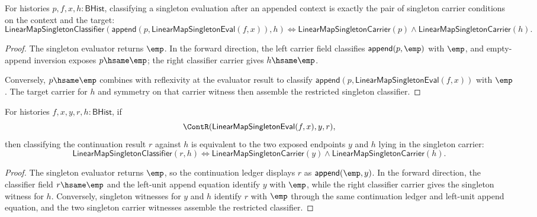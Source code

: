 \begin{theorem}
\label{thm:linearmap-singleton-eval-append-context-classifier}
For histories $p,f,x,h:\mathsf{BHist}$, classifying a singleton evaluation
after an appended context is exactly the pair of singleton carrier conditions
on the context and the target:
$$
\mathsf{LinearMapSingletonClassifier}
  (\mathsf{append}(p,\mathsf{LinearMapSingletonEval}(f,x)),h)
\Longleftrightarrow
\mathsf{LinearMapSingletonCarrier}(p)\land
\mathsf{LinearMapSingletonCarrier}(h).
$$
\end{theorem}
\begin{proof}
The singleton evaluator returns $\emp$. In the forward direction, the left
carrier field classifies $\mathsf{append}(p,\emp)$ with $\emp$, and
empty-append inversion exposes $p\hsame\emp$; the right classifier carrier
gives $h\hsame\emp$.

Conversely, $p\hsame\emp$ combines with reflexivity at the evaluator result to
classify $\mathsf{append}(p,\mathsf{LinearMapSingletonEval}(f,x))$ with
$\emp$. The target carrier for $h$ and symmetry on that carrier witness then
assemble the restricted singleton classifier.
\end{proof}

\begin{theorem}
\label{thm:linearmap-singleton-eval-continuation-classifier}
For histories $f,x,y,r,h:\mathsf{BHist}$, if
$$
\ContR(\mathsf{LinearMapSingletonEval}(f,x),y,r),
$$
then classifying the continuation result $r$ against $h$ is equivalent to
the two exposed endpoints $y$ and $h$ lying in the singleton carrier:
$$
\mathsf{LinearMapSingletonClassifier}(r,h)
\Longleftrightarrow
\mathsf{LinearMapSingletonCarrier}(y)\land
\mathsf{LinearMapSingletonCarrier}(h).
$$
\end{theorem}
\begin{proof}
The singleton evaluator returns $\emp$, so the continuation ledger displays
$r$ as $\mathsf{append}(\emp,y)$. In the forward direction, the classifier
field $r\hsame\emp$ and the left-unit append equation identify $y$ with
$\emp$, while the right classifier carrier gives the singleton witness for
$h$. Conversely, singleton witnesses for $y$ and $h$ identify $r$ with
$\emp$ through the same continuation ledger and left-unit append equation,
and the two singleton carrier witnesses assemble the restricted classifier.
\end{proof}

